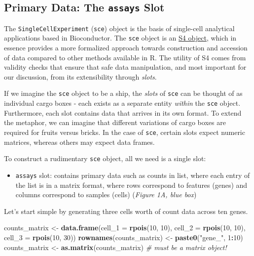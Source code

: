 \documentclass[]{book}
\newenvironment{Shaded}{\begin{snugshade}}{\end{snugshade}}
\newcommand{\CommentTok}[1]{\textcolor[rgb]{0.56,0.35,0.01}{\textit{#1}}}
\newcommand{\DataTypeTok}[1]{\textcolor[rgb]{0.13,0.29,0.53}{#1}}
\newcommand{\DecValTok}[1]{\textcolor[rgb]{0.00,0.00,0.81}{#1}}
\newcommand{\KeywordTok}[1]{\textcolor[rgb]{0.13,0.29,0.53}{\textbf{#1}}}
\newcommand{\NormalTok}[1]{#1}
\newcommand{\OperatorTok}[1]{\textcolor[rgb]{0.81,0.36,0.00}{\textbf{#1}}}
\newcommand{\StringTok}[1]{\textcolor[rgb]{0.31,0.60,0.02}{#1}}
\providecommand{\tightlist}{%
  \setlength{\itemsep}{0pt}\setlength{\parskip}{0pt}}
\begin{document}
\hypertarget{primary-data-the-assays-slot}{%
\subsection{\texorpdfstring{Primary Data: The \texttt{assays} Slot}{Primary Data: The assays Slot}}\label{primary-data-the-assays-slot}}

The \texttt{SingleCellExperiment} (\texttt{sce}) object is the basis of single-cell analytical applications based in Bioconductor. The \texttt{sce} object is an \href{https://adv-r.hadley.nz/s4.html}{S4 object}, which in essence provides a more formalized approach towards construction and accession of data compared to other methods available in R. The utility of S4 comes from validity checks that ensure that safe data manipulation, and most important for our discussion, from its extensibility through \emph{slots}.

If we imagine the \texttt{sce} object to be a ship, the \emph{slots} of \texttt{sce} can be thought of as individual cargo boxes - each exists as a separate entity \emph{within} the \texttt{sce} object. Furthermore, each slot contains data that arrives in its own format. To extend the metaphor, we can imagine that different variations of cargo boxes are required for fruits versus bricks. In the case of \texttt{sce}, certain slots expect numeric matrices, whereas others may expect data frames.

To construct a rudimentary \texttt{sce} object, all we need is a single slot:

\begin{itemize}
\tightlist
\item
  \texttt{assays} slot: contains primary data such as counts in list, where each entry of the list is in a matrix format, where rows correspond to features (genes) and columns correspond to samples (cells) (\emph{Figure 1A, blue box})
\end{itemize}

Let's start simple by generating three cells worth of count data across ten genes.

\begin{Shaded}
\begin{Highlighting}[]
\NormalTok{counts_matrix <-}\StringTok{ }\KeywordTok{data.frame}\NormalTok{(}\DataTypeTok{cell_1 =} \KeywordTok{rpois}\NormalTok{(}\DecValTok{10}\NormalTok{, }\DecValTok{10}\NormalTok{), }
                    \DataTypeTok{cell_2 =} \KeywordTok{rpois}\NormalTok{(}\DecValTok{10}\NormalTok{, }\DecValTok{10}\NormalTok{), }
                    \DataTypeTok{cell_3 =} \KeywordTok{rpois}\NormalTok{(}\DecValTok{10}\NormalTok{, }\DecValTok{30}\NormalTok{))}
\KeywordTok{rownames}\NormalTok{(counts_matrix) <-}\StringTok{ }\KeywordTok{paste0}\NormalTok{(}\StringTok{"gene_"}\NormalTok{, }\DecValTok{1}\OperatorTok{:}\DecValTok{10}\NormalTok{)}
\NormalTok{counts_matrix <-}\StringTok{ }\KeywordTok{as.matrix}\NormalTok{(counts_matrix) }\CommentTok{# must be a matrix object!}
\end{Highlighting}
\end{Shaded}
\end{document}
